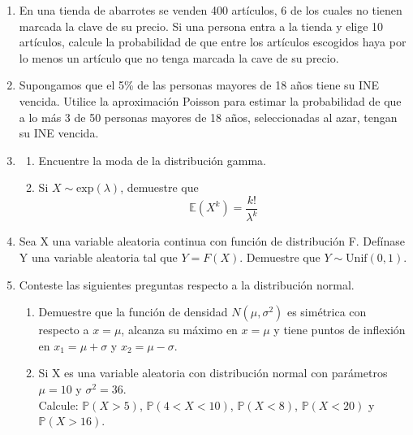 \documentclass[11pt,a4paper]{report}
\begin{document}
\begin{enumerate}
		\item{
			En una tienda de abarrotes se venden 400 artículos, 6 de los cuales
            no tienen marcada la clave de su precio. Si una persona entra a la
            tienda y elige 10 artículos, calcule la probabilidad de que entre
            los  artículos escogidos haya por lo menos un artículo que no tenga
            marcada la cave de su precio.
		}

		\item{
			Supongamos que el 5\% de las personas mayores de 18 años tiene su
            INE vencida. Utilice la aproximación Poisson para estimar la
            probabilidad de que a lo más 3 de 50 personas mayores de 18 años,
            seleccionadas al azar, tengan su INE vencida.
		}

		\item{
			\begin{enumerate}
				\item {
					Encuentre la moda de la distribución gamma.
				}

				\item {
					Si $X \sim \text{exp}(\lambda)$, demuestre que
                        $$ \mathbb{E}(X^k) = \frac{k!}{\lambda^k} $$
				}

			\end{enumerate}
		}

		\item{
			Sea X una variable aleatoria continua con función de distribución F.
            Defínase Y una variable aleatoria tal que $Y = F(X)$. Demuestre que
            $Y \sim \text{Unif}(0,1)$.
		}

		\item{
			Conteste las siguientes preguntas respecto a la distribución normal.
			\begin{enumerate}
				\item {
					Demuestre que la función de densidad $N(\mu, \sigma^2)$ es
                    simétrica con respecto a $x = \mu$, alcanza su máximo en
                    $x = \mu$ y tiene puntos de inflexión en $x_1= \mu + \sigma$
                    y $x_2 = \mu - \sigma$.
				}

				\item {
					Si X es una variable aleatoria con distribución normal con
                    parámetros $\mu = 10$ y $\sigma^2 = 36$.\\
                    Calcule: $\mathbb{P}(X > 5)$, $\mathbb{P}(4 < X < 10)$,
                    $\mathbb{P}(X < 8)$, $\mathbb{P}(X < 20)$ y
                    $\mathbb{P}(X > 16)$.
				}


\end{enumerate}}
\end{enumerate}
\end{document}
